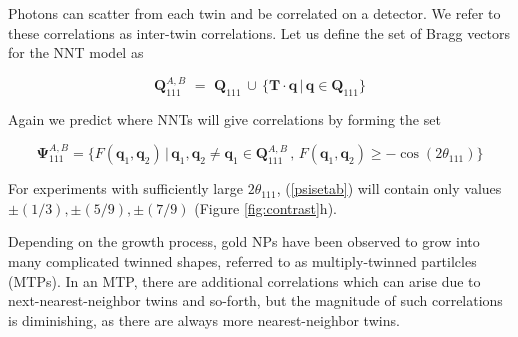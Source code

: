 \documentclass [11pt,fleqn]{article}
\def \be {\begin{equation}}
\def \ee {\end{equation}}
\begin{document}
Photons can scatter from each twin and be correlated on a detector. We refer to these correlations as inter-twin correlations. Let us define the set of Bragg vectors for the NNT model as 

\be
\bm Q^{A,B}_{111}\,\, =\,\, \bm Q_{111} \, \cup \, \{  \mathbf T  \cdot \bm q \, \big |\, \bm q \in \bm Q_{111} \}
\ee

Again we predict where NNTs will give correlations by forming the set

\be \label{psisetab}
\bm \Psi^{A,B}_{111} = \{ F( \bm q_1, \bm q_2)\, \big | \, \bm q_1, \bm q_2 \ne \bm q_1 \in \bm Q^{A,B}_{111}\, ,\,  F( \bm q_1, \bm q_2) \ge -\cos ( 2\theta_{111}  )  \}
\ee

For experiments with sufficiently large $2\theta_{111}$, (\ref{psisetab}) will contain only values $\pm (1/3), \pm (5/9), \pm(7/9)$ (Figure \ref{fig:contrast}h). 

Depending on the growth process, gold NPs have been observed to grow into many complicated twinned shapes, referred to as multiply-twinned partilcles (MTPs). In an MTP, there are additional correlations which can arise due to next-nearest-neighbor twins and so-forth, but the magnitude of such correlations is diminishing, as there are always more nearest-neighbor twins. 







\end{document}
